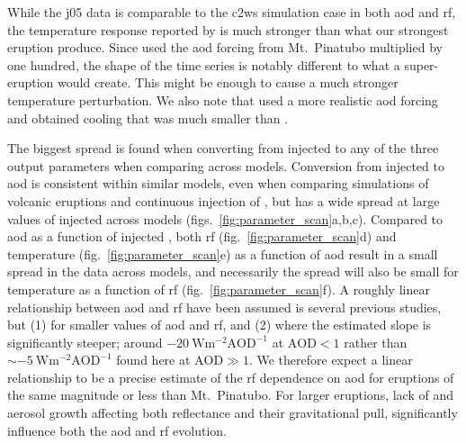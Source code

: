 \documentclass{ametsocV6.1}
\newcommand{\iso}[1][i]{{#1}njected \ce{SO2}}
\begin{document}
While the \gls{j05} data is comparable to the \gls{c2ws} simulation case in both
\gls{aod} and \gls{rf}, the temperature response reported by \citet{jones2005} is much
stronger than what our strongest eruption produce. Since \citet{jones2005} used the
\gls{aod} forcing from Mt.\ Pinatubo multiplied by one hundred, the shape of the time
series is notably different to what a super-eruption would create. This might be enough
to cause a much stronger temperature perturbation. We also note that
\citet{timmreck2010} used a more realistic \gls{aod} forcing and obtained cooling that
was much smaller than \citet{jones2005}.

The biggest spread is found when converting from \iso{} to any of the three output
parameters when comparing across models. Conversion from \iso{} to \gls{aod} is
consistent within similar models, even when comparing simulations of volcanic eruptions
\citep{timmreck2010} and continuous injection of  \citep{niemeier2015}, but has
a wide spread at large values of \iso{} across models
(figs.~\ref{fig:parameter_scan}a,b,c). Compared to \gls{aod} as a function of \iso{},
both \gls{rf} (fig.~\ref{fig:parameter_scan}d) and temperature
(fig.~\ref{fig:parameter_scan}e) as a function of \gls{aod} result in a small spread in
the data across models, and necessarily the spread will also be small for temperature as
a function of \gls{rf} (fig.~\ref{fig:parameter_scan}f). A roughly linear relationship
between \gls{aod} and \gls{rf} have been assumed is several previous studies, but (1)
for smaller values of \gls{aod} and \gls{rf}, and (2) where the estimated slope is
significantly steeper; around \(\SI{-20}{\watt\metre^{-2}\mathrm{AOD}^{-1}}\) at
\(\mathrm{AOD}<1\) rather than \(\sim\SI{-5}{\watt\metre^{-2}\mathrm{AOD}^{-1}}\) found
here at \(\mathrm{AOD}\gg1\). We therefore expect a linear relationship to be a precise
estimate of the \gls{rf} dependence on \gls{aod} for eruptions of the same magnitude or
less than Mt.\ Pinatubo. For larger eruptions, lack of  and aerosol growth
affecting both reflectance and their gravitational pull, significantly influence both
the \gls{aod} and \gls{rf} evolution.
\end{document}
